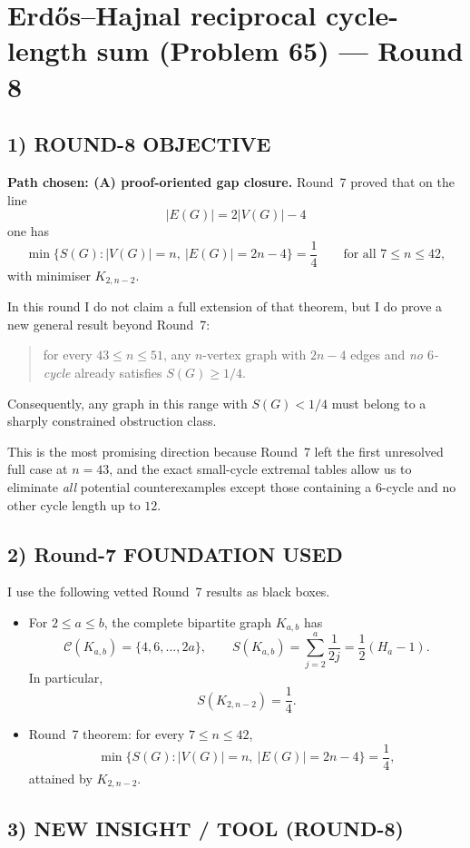 \section{Erd\H{o}s--Hajnal reciprocal cycle-length sum (Problem 65) --- Round 8}

\subsection*{1) ROUND-8 OBJECTIVE}

\textbf{Path chosen: (A) proof-oriented gap closure.}
Round~7 proved that on the line
\[
|E(G)|=2|V(G)|-4
\]
one has
\[
\min\{S(G): |V(G)|=n,\ |E(G)|=2n-4\}=\frac14
\qquad\text{for all }7\le n\le 42,
\]
with minimiser $K_{2,n-2}$.

In this round I do not claim a full extension of that theorem, but I do prove a new general result beyond Round~7:
\begin{quote}
for every $43\le n\le 51$, any $n$-vertex graph with $2n-4$ edges and \emph{no $6$-cycle} already satisfies $S(G)\ge 1/4$.
\end{quote}
Consequently, any graph in this range with $S(G)<1/4$ must belong to a sharply constrained obstruction class.

This is the most promising direction because Round~7 left the first unresolved full case at $n=43$, and the exact small-cycle extremal tables allow us to eliminate \emph{all} potential counterexamples except those containing a $6$-cycle and no other cycle length up to $12$.

\subsection*{2) Round-7 FOUNDATION USED}

I use the following vetted Round~7 results as black boxes.

\begin{itemize}
\item[(F1)] For $2\le a\le b$, the complete bipartite graph $K_{a,b}$ has
\[
\mathcal C(K_{a,b})=\{4,6,\dots,2a\},
\qquad
S(K_{a,b})=\sum_{j=2}^{a}\frac1{2j}=\frac12(H_a-1).
\]
In particular,
\[
S(K_{2,n-2})=\frac14.
\]

\item[(F2)] Round~7 theorem: for every $7\le n\le 42$,
\[
\min\{S(G): |V(G)|=n,\ |E(G)|=2n-4\}=\frac14,
\]
attained by $K_{2,n-2}$.
\end{itemize}

\subsection*{3) NEW INSIGHT / TOOL (ROUND-8)}

